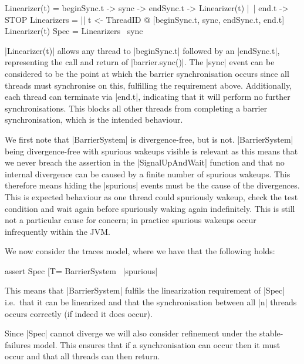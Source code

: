 \begin{cspm}[caption={The linearizer specification for barrier synchronisations}]
Linearizer(t) = beginSync.t -> sync -> endSync.t -> Linearizer(t)
              |~| end.t -> STOP
Linearizers = || t <- ThreadID @ [{beginSync.t, sync, endSync.t, end.t}] Linearizer(t)
Spec = Linearizers \ {sync}
\end{cspm}

|Linearizer(t)| allows any thread to |beginSync.t| followed by an |endSync.t|, representing the call and return of |barrier.sync()|. The |sync| event can be considered to be the point at which the barrier synchronisation occurs since all threads must synchronise on this, fulfilling the requirement above. Additionally, each thread can terminate via |end.t|, indicating that it will perform no further synchronisations. This blocks all other threads from completing a barrier synchronisation, which is the intended behaviour.

We first note that |BarrierSystem| is divergence-free, but  is not. |BarrierSystem| being divergence-free with spurious wakeups visible is relevant as this means that we never breach the assertion in the |SignalUpAndWait| function and that no internal divergence can be caused by a finite number of spurious wakeups. This therefore means hiding the |spurious| events must be the cause of the divergences.
This is expected behaviour as one thread could spuriously wakeup, check the test condition and wait again before spuriously waking again indefinitely. This is still not a particular cause for concern; in practice spurious wakeups occur infrequently within the JVM.

We now consider the traces model, where we have that the following holds:
\begin{cspm}
assert Spec [T= BarrierSystem \ {|spurious|}
\end{cspm}
This means that |BarrierSystem| fulfils the linearization requirement of |Spec| i.e.~that it can be linearized and that the synchronisation between all |n| threads occurs correctly (if indeed it does occur).

Since |Spec| cannot diverge we will also consider refinement under the stable-failures model. This ensures that if a synchronisation can occur then it must occur and that all threads can then return.


